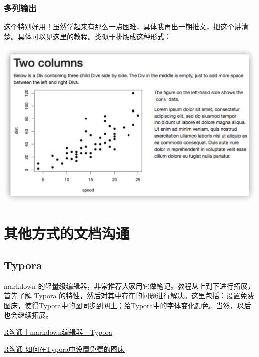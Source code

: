 \documentclass[
]{book}
\begin{document}
\hypertarget{ux591aux5217ux8f93ux51fa}{%
\subsection{多列输出}\label{ux591aux5217ux8f93ux51fa}}

这个特别好用！虽然学起来有那么一点困难，具体我再出一期推文，把这个讲清楚。具体可以见这里的\href{https://bookdown.org/yihui/rmarkdown-cookbook/multi-column.html}{教程}。类似于排版成这种形式：

\includegraphics{images/paste-C2B95842.png}

\hypertarget{rmarkdown-extended}{%
\chapter{其他方式的文档沟通}\label{rmarkdown-extended}}

\hypertarget{typora}{%
\section{Typora}\label{typora}}

markdown 的轻量级编辑器，非常推荐大家用它做笔记。教程从上到下进行拓展，首先了解 Typora 的特性，然后对其中存在的问题进行解决。这里包括：设置免费图床，使得Typora中的图同步到网上；给Typora中的字体变化颜色。当然，以后也会继续拓展。

\href{http://mp.weixin.qq.com/s?__biz=MzI1NjUwMjQxMQ==\&mid=2247491318\&idx=1\&sn=47128737582a34677926a9f64f03e4ed\&chksm=ea24e112dd53680478ac90151554ebdde72ab122fcc84bae4da6e87e9c97b020275ecabc846c\&scene=21\#wechat_redirect}{R沟通｜markdown编辑器---Typora}

\href{http://mp.weixin.qq.com/s?__biz=MzI1NjUwMjQxMQ==\&mid=2247492557\&idx=1\&sn=75024932a02364cb200873d069f79e29\&chksm=ea271c29dd50953fbec48d64f7ac007893037bf2f89ecf023be5addff313eeefeb4ecae85b0b\&scene=21\#wechat_redirect}{R沟通 \textbar{} 如何在Typora中设置免费的图床}
\end{document}
